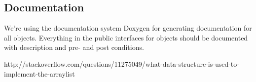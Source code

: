 \documentclass[11pt, letterpaper, twoside, openright]{book}
\begin{document}
  \subsection{Documentation}
    We're using the documentation system Doxygen for generating documentation for all objects. Everything in the public interfaces for objects should be documented with description and pre- and post conditions.



    http://stackoverflow.com/questions/11275049/what-data-structure-is-used-to-implement-the-arraylist
  
\end{document}
